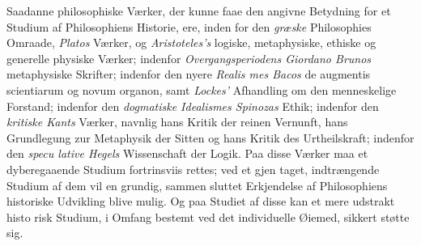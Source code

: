 Saadanne philosophiske Værker, der kunne faae den angivne
Betydning for et Studium af Philosophiens Historie, ere, inden\-%
for den \emph{græske} Philosophies Omraade, \emph{Platos} Værker, og
\emph{Aristoteles's} logiske, metaphysiske, ethiske og generelle
physiske Værker; indenfor \emph{Overgangsperiodens Giordano
Brunos} metaphysiske Skrifter; indenfor den nyere \emph{Realis\-%
mes Bacos} de augmentis scientiarum og novum organon,
samt \emph{Lockes'} Afhandling om den menneskelige Forstand;
indenfor den \emph{dogmatiske Idealismes Spinozas} Ethik;
indenfor den \emph{kritiske Kants} Værker, navnlig hans Kritik
der reinen Vernunft, hans Grundlegung zur Metaphysik der
Sitten og hans Kritik des Urtheilskraft; indenfor den \emph{specu\-%
lative Hegels} Wissenschaft der Logik. Paa disse Værker
maa et dyberegaaende Studium fortrinsviis rettes; ved et gjen\-%
taget, indtrængende Studium af dem vil en grundig, sammen\-%
sluttet Erkjendelse af Philosophiens historiske Udvikling blive
mulig. Og paa Studiet af disse kan et mere udstrakt histo\-%
risk Studium, i Omfang bestemt ved det individuelle Øiemed,
sikkert støtte sig.

